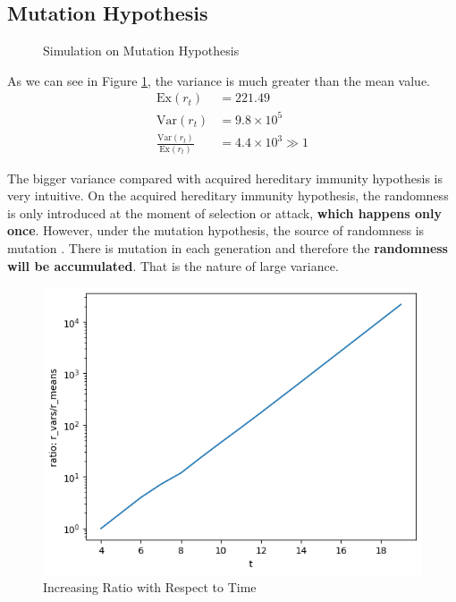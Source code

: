 \documentclass[UTF-8]{article}
\begin{document}
\subsection{Mutation Hypothesis}
\begin{figure}[h]
    \centering
    \caption{Simulation on Mutation Hypothesis}  
    \label{Simulation on Mutation Hypothesis}
 \end{figure}
 As we can see in Figure \ref{Simulation on Mutation Hypothesis}, the variance is much greater than the mean value.
 \begin{align}
    \text{Ex}(r_t)&=221.49\\
    \text{Var}(r_t)&=9.8\times 10 ^5\\
    \frac{\text{Var}(r_t)}{\text{Ex}(r_t)}&=4.4\times 10^3\gg1
\end{align}

The bigger variance compared with acquired hereditary immunity hypothesis is very intuitive.
On the acquired hereditary immunity  hypothesis, the randomness is only introduced at the moment of selection or attack, \textbf{which happens only once}.
However, under the mutation hypothesis, the source of randomness is mutation .
There is mutation in each generation and therefore the \textbf{randomness will be accumulated}.
That is the nature of large variance.

\begin{figure}[h]
    \centering
    \includegraphics[width=0.4\linewidth]{../Figures/ration.png}
    \caption{Increasing Ratio with Respect to Time}
    \label{ratio-time}
\end{figure}
\end{document}
